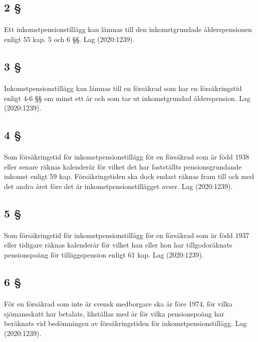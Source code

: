 \documentclass[a4paper,notitlepage,openany,10pt]{book}
\begin{document}
\subsection*{2 §}
\paragraph*{}
Ett inkomstpensionstillägg kan lämnas till den inkomstgrundade ålderspensionen enligt 55 kap. 5 och 6 §§.
Lag (2020:1239).
\subsection*{3 §}
\paragraph*{}
Inkomstpensionstillägg kan lämnas till en försäkrad som har en försäkringstid enligt 4-6 §§ om minst ett år och som tar ut inkomstgrundad ålderspension.
Lag (2020:1239).
\subsection*{4 §}
\paragraph*{}
Som försäkringstid för inkomstpensionstillägg för en försäkrad som är född 1938 eller senare räknas kalenderår för vilket det har fastställts pensionsgrundande inkomst enligt 59 kap. Försäkringstiden ska dock endast räknas fram till och med det andra året före det år inkomstpensionstillägget avser.
Lag (2020:1239).
\subsection*{5 §}
\paragraph*{}
Som försäkringstid för inkomstpensionstillägg för en försäkrad som är född 1937 eller tidigare räknas kalenderår för vilket han eller hon har tillgodoräknats pensionspoäng för tilläggspension enligt 61 kap.
Lag (2020:1239).
\subsection*{6 §}
\paragraph*{}
För en försäkrad som inte är svensk medborgare ska år före 1974, för vilka sjömansskatt har betalats, likställas med år för vilka pensionspoäng har beräknats vid bedömningen av försäkringstiden för inkomstpensionstillägg.
Lag (2020:1239).
\end{document}

